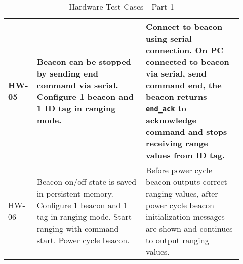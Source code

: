 \begin{table}[h!]
\begin{tabular}{|p{0.07\linewidth}|p{0.45\linewidth}|p{0.40\linewidth}|}
	\hline  
	HW-05
	& Beacon can be stopped by sending end command via serial. Configure 1 beacon and 1 ID tag in ranging mode.
	& Connect to beacon using serial connection.
	On PC connected to beacon via serial, send command end, the beacon returns \texttt{end\_ack} to acknowledge command and stops receiving range values from ID tag.\\
	
	\hline  
	HW-06
	& Beacon on/off state is saved in persistent memory. Configure 1 beacon and 1 tag in ranging mode. Start ranging with command start. Power cycle beacon.
	& Before power cycle beacon outputs correct ranging values, after power cycle beacon initialization messages are shown and continues to output ranging values.\\

    \hline
    \end{tabular}
    \caption{Hardware Test Cases - Part 1}
\end{table}

